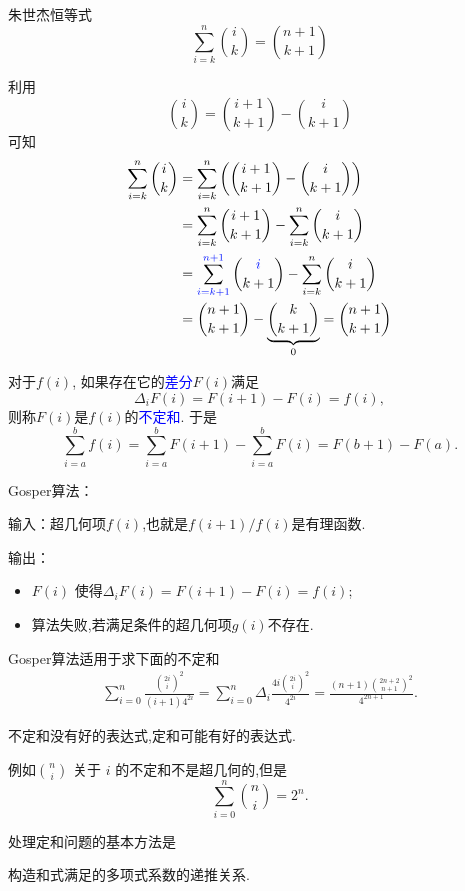 \documentclass[punct]{ctexbeamer}
\newcommand{\blue}{\textcolor{blue}}
\begin{document}
\begin{frame}
    \begin{block}{朱世杰恒等式}
        $$\sum_{i=k}^{n}\binom{i}{k}=\binom{n+1}{k+1}$$
    \end{block}
  利用
    $$
    \binom{i}{k} =  \binom{i+1}{k+1}-\binom{i}{k+1}
    $$
    可知
    $$
    \begin{aligned}
        \sum_{i=k}^{n}\binom{i}{k}
        &=\sum_{i=k}^{n}\left( \binom{i+1}{k+1}-\binom{i}{k+1}\right) \\
        &=\sum_{i=k}^{n}\binom{i+1}{k+1}  -\sum_{i=k}^{n}\binom{i}{k+1} \\
        &=\sum_{\blue{i=k+1}}^{\blue{n+1}}\binom{\blue{i}}{k+1}-\sum_{i=k}^{n}\binom{i}{k+1} \\
        &=\binom{n+1}{k+1}-\underbrace{\binom{k}{k+1}}_{0}
        =\binom{n+1}{k+1}
    \end{aligned}
    $$
\end{frame}
\begin{frame}
    对于$f(i)$, 如果存在它的\blue{差分}$F(i)$满足
    $$\Delta_i F(i) =F(i+1)-F(i)=f(i),$$
    则称$F(i)$是$f(i)$的\blue{不定和}.
    于是
    $$
        \sum_{i=a}^{b} f(i) =\sum_{i=a}^{b}  F(i+1)-\sum_{i=a}^{b}  F(i) =F(b+1)-F(a).
    $$


       \alert{Gosper算法}：

        输入：超几何项$f(i)$,也就是$f(i+1)/f(i)$是有理函数.

        输出：
        \begin{itemize}
            \item $F(i)$ 使得$\Delta_i F(i)=F(i+1)-F(i)=f(i)$;
           \item   算法失败,若满足条件的超几何项$g(i)$不存在.
        \end{itemize}

    Gosper算法适用于求下面的不定和
\begin{align*}
    \sum_{i=0}^{n}\frac{\binom{2i}{i}^2}{(i+1)4^{2i}}=\sum_{i=0}^{n}\Delta_i \frac{4i\binom{2i}{i}^2}{4^{2i}}=\frac{(n+1)\binom{2n+2}{n+1}^2}{4^{2n+1}}.
\end{align*}

\end{frame}

\begin{frame}



不定和没有好的表达式,定和可能有好的表达式.

例如$\binom{n}{i}$
关于 $i$ 的不定和不是超几何的,但是
    $$\sum_{i=0}^{n}\binom{n}{i}=2^n.$$

处理定和问题的基本方法是
\begin{center}
\alert{构造和式满足的多项式系数的递推关系.}
\end{center}

\end{frame}
\end{document}
